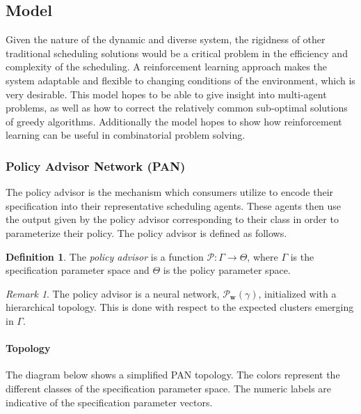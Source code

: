 \documentclass{article}
\theoremstyle{definition}
\newtheorem{definition}{Definition}[section]
\theoremstyle{remark}
\newtheorem*{remark}{Remark}
\begin{document}
		\subsection{Model}

		Given the nature of the dynamic and diverse system, the rigidness of other traditional scheduling solutions would be a critical problem in the efficiency and complexity of the scheduling. A reinforcement learning approach makes the system adaptable and flexible to changing conditions of the environment, which is very desirable. This model hopes to be able to give insight into multi-agent problems, as well as how to correct the relatively common sub-optimal solutions of greedy algorithms. Additionally the model hopes to show how reinforcement learning can be useful in combinatorial problem solving.

			\subsubsection{Policy Advisor Network (PAN)}

			The policy advisor is the mechanism which consumers utilize to encode their specification into their representative scheduling agents. These agents then use the output given by the policy advisor corresponding to their class in order to parameterize their policy. The policy advisor is defined as follows.

			\begin{definition}
				The \emph{policy advisor} is a function $\mathcal{P}: \Gamma \rightarrow \Theta$, where $\Gamma$ is the specification parameter space and $\Theta$ is the policy parameter space.
			\end{definition}

			\begin{remark}
				The policy advisor is a neural network, $\mathcal{P}_{\mathbf{w}}(\gamma)$, initialized with a hierarchical topology. This is done with respect to the expected clusters emerging in $\Gamma$.
			\end{remark}


				\paragraph{Topology}

				The diagram below shows a simplified PAN topology. The colors represent the different classes of the specification parameter space. The numeric labels are indicative of the specification parameter vectors.
\end{document}
